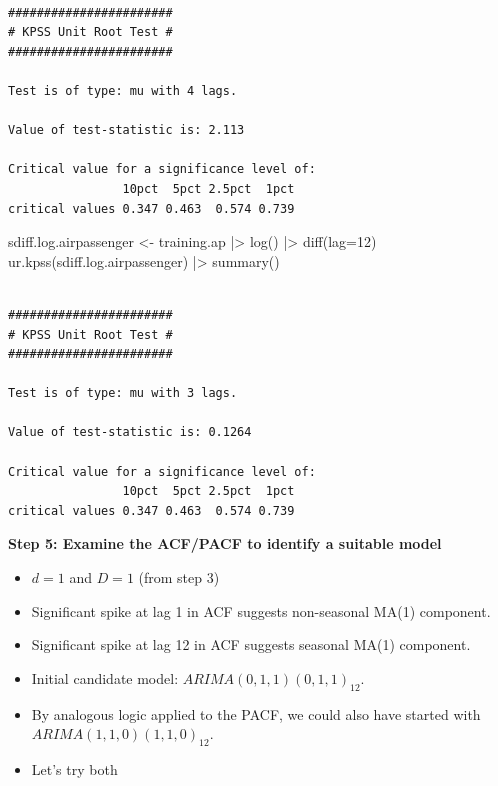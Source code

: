 \documentclass[
  11pt,
  a4paper,
]{report}
\newenvironment{Shaded}{\begin{snugshade}}{\end{snugshade}}
\newcommand{\AttributeTok}[1]{\textcolor[rgb]{0.40,0.45,0.13}{#1}}
\newcommand{\DecValTok}[1]{\textcolor[rgb]{0.68,0.00,0.00}{#1}}
\newcommand{\FunctionTok}[1]{\textcolor[rgb]{0.28,0.35,0.67}{#1}}
\newcommand{\NormalTok}[1]{\textcolor[rgb]{0.00,0.23,0.31}{#1}}
\newcommand{\OtherTok}[1]{\textcolor[rgb]{0.00,0.23,0.31}{#1}}
\newcommand{\SpecialCharTok}[1]{\textcolor[rgb]{0.37,0.37,0.37}{#1}}
\begin{document}
\begin{verbatim}

####################### 
# KPSS Unit Root Test # 
####################### 

Test is of type: mu with 4 lags. 

Value of test-statistic is: 2.113 

Critical value for a significance level of: 
                10pct  5pct 2.5pct  1pct
critical values 0.347 0.463  0.574 0.739
\end{verbatim}

\begin{Shaded}
\begin{Highlighting}[]
\NormalTok{sdiff.log.airpassenger }\OtherTok{\textless{}{-}}\NormalTok{ training.ap }\SpecialCharTok{|\textgreater{}} \FunctionTok{log}\NormalTok{() }\SpecialCharTok{|\textgreater{}} \FunctionTok{diff}\NormalTok{(}\AttributeTok{lag=}\DecValTok{12}\NormalTok{)}
\FunctionTok{ur.kpss}\NormalTok{(sdiff.log.airpassenger) }\SpecialCharTok{|\textgreater{}} \FunctionTok{summary}\NormalTok{()}
\end{Highlighting}
\end{Shaded}

\begin{verbatim}

####################### 
# KPSS Unit Root Test # 
####################### 

Test is of type: mu with 3 lags. 

Value of test-statistic is: 0.1264 

Critical value for a significance level of: 
                10pct  5pct 2.5pct  1pct
critical values 0.347 0.463  0.574 0.739
\end{verbatim}

\textbf{Step 5: Examine the ACF/PACF to identify a suitable model}

\begin{itemize}
\item
  \(d=1\) and \(D=1\) (from step 3)
\item
  Significant spike at lag 1 in ACF suggests non-seasonal MA(1)
  component.
\item
  Significant spike at lag 12 in ACF suggests seasonal MA(1) component.
\item
  Initial candidate model: \(ARIMA(0,1,1)(0,1,1)_{12}\).
\item
  By analogous logic applied to the PACF, we could also have started
  with \(ARIMA(1,1,0)(1,1,0)_{12}\).
\item
  Let's try both
\end{itemize}
\end{document}

